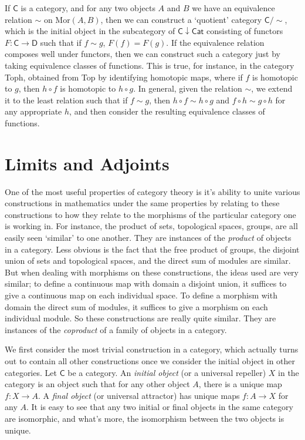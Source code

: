 If $\mathsf{C}$ is a category, and for any two objects $A$ and $B$ we have an equivalence relation $\sim$ on $\text{Mor}(A,B)$, then we can construct a `quotient' category $\mathsf{C}/\sim$, which is the initial object in the subcategory of $\mathsf{C} \downarrow \mathsf{Cat}$ consisting of functors $F: \mathsf{C} \to \mathsf{D}$ such that if $f \sim g$, $F(f) = F(g)$. If the equivalence relation composes well under functors, then we can construct such a category just by taking equivalence classes of functions. This is true, for instance, in the category {\sf Toph}, obtained from {\sf Top} by identifying homotopic maps, where if $f$ is homotopic to $g$, then $h \circ f$ is homotopic to $h \circ g$. In general, given the relation $\sim$, we extend it to the least relation such that if $f \sim g$, then $h \circ f \sim h \circ g$ and $f \circ h \sim g \circ h$ for any appropriate $h$, and then consider the resulting equivalence classes of functions.


\chapter{Limits and Adjoints}

One of the most useful properties of category theory is it's ability to unite various constructions in mathematics under the same properties by relating to these constructions to how they relate to the morphisms of the particular category one is working in. For instance, the product of sets, topological spaces, groups, are all easily seen `similar' to one another. They are instances of the \emph{product} of objects in a category. Less obvious is the fact that the free product of groups, the disjoint union of sets and topological spaces, and the direct sum of modules are similar. But when dealing with morphisms on these constructions, the ideas used are very similar; to define a continuous map with domain a disjoint union, it suffices to give a continuous map on each individual space. To define a morphism with domain the direct sum of modules, it suffices to give a morphism on each individual module. So these constructions are really quite similar. They are instances of the \emph{coproduct} of a family of objects in a category.

We first consider the most trivial construction in a category, which actually turns out to contain all other constructions once we consider the initial object in other categories. Let $\mathsf{C}$ be a category. An \emph{initial object} (or a universal repeller) $X$ in the category is an object such that for any other object $A$, there is a unique map $f: X \to A$. A \emph{final object} (or universal attractor) has unique maps $f: A \to X$ for any $A$. It is easy to see that any two initial or final objects in the same category are isomorphic, and what's more, the isomorphism between the two objects is unique.

